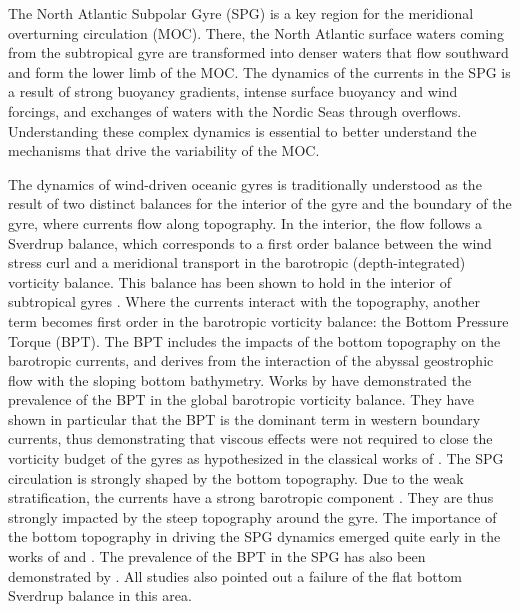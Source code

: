 \documentclass[os, manuscript]{copernicus}
\begin{document}
\introduction  %
The North Atlantic Subpolar Gyre (SPG) is a key region for the meridional overturning circulation (MOC). There, the North Atlantic surface waters coming from the subtropical gyre are transformed into denser waters that flow southward and form the lower limb of the MOC. The dynamics of the currents in the SPG is a result of strong buoyancy gradients, intense surface buoyancy and wind forcings, and exchanges of waters with the Nordic Seas through overflows. Understanding these complex dynamics is essential to better understand the mechanisms that drive the variability of the MOC. 

 The dynamics of wind-driven oceanic gyres is traditionally understood as the result of two distinct balances for the interior of the gyre and the boundary of the gyre, where currents flow along topography. In the interior, the flow follows a Sverdrup balance, which corresponds to a first order balance between the wind stress curl and a meridional transport in the barotropic (depth-integrated) vorticity balance. This balance has been shown to hold in the interior of subtropical gyres \citep{hughes2001, TDBAJS14, yeager2015, schoonover2016, sonnewald2019, LBST19}. Where the currents interact with the topography, another term becomes first order in the barotropic vorticity balance: the Bottom Pressure Torque (BPT). The BPT includes the impacts of the bottom topography on the barotropic currents, and derives from the interaction of the abyssal geostrophic flow with the sloping bottom bathymetry. Works by \citet{hughes2000,hughes2001, jackson2006, schoonover2016} have demonstrated the prevalence of the BPT in the global barotropic vorticity balance. They have shown in particular that the BPT is the dominant term in western boundary currents, thus demonstrating that viscous effects were not required to close the vorticity budget of the gyres as hypothesized in the classical works of \citet{Munk1950}. 
 The SPG circulation is strongly shaped by the bottom topography. Due to the weak stratification, the currents have a strong barotropic component \citep{vanaken1995,daniault2016,fischer2004}.  They are thus strongly impacted by the steep topography around the gyre. The importance of the bottom topography in driving the SPG dynamics emerged quite early in the works of \citet{luyten1985} and \citet{wunsch1985}. The prevalence of the BPT in the SPG has also been demonstrated by \citet{hughes2001, spence2012, yeager2015}. All studies also pointed out a failure of the flat bottom Sverdrup balance in this area. 
\end{document}
